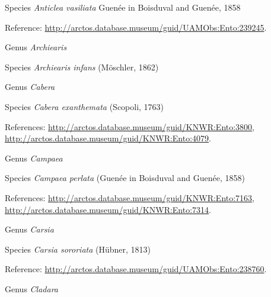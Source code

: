 \documentclass[9pt, article]{memoir}
\begin{document}
\begin{multicols}{2}
\vspace{6pt}\noindent\hspace{36pt}Species \textit{Anticlea vasiliata} Guenée in Boisduval and Guenée, 1858


\vspace{6pt}Reference: 
\url{http://arctos.database.museum/guid/UAMObs:Ento:239245}.

\vspace{6pt}\noindent\hspace{30pt}Genus \textit{Archiearis}


\vspace{6pt}\noindent\hspace{36pt}Species \textit{Archiearis infans} (Möschler, 1862)


\vspace{6pt}\noindent\hspace{30pt}Genus \textit{Cabera}


\vspace{6pt}\noindent\hspace{36pt}Species \textit{Cabera exanthemata} (Scopoli, 1763)


\vspace{6pt}References: 
\url{http://arctos.database.museum/guid/KNWR:Ento:3800}, 
\url{http://arctos.database.museum/guid/KNWR:Ento:4079}.

\vspace{6pt}\noindent\hspace{30pt}Genus \textit{Campaea}


\vspace{6pt}\noindent\hspace{36pt}Species \textit{Campaea perlata} (Guenée in Boisduval and Guenée, 1858)


\vspace{6pt}References: 
\url{http://arctos.database.museum/guid/KNWR:Ento:7163}, 
\url{http://arctos.database.museum/guid/KNWR:Ento:7314}.

\vspace{6pt}\noindent\hspace{30pt}Genus \textit{Carsia}


\vspace{6pt}\noindent\hspace{36pt}Species \textit{Carsia sororiata} (Hübner, 1813)


\vspace{6pt}Reference: 
\url{http://arctos.database.museum/guid/UAMObs:Ento:238760}.

\vspace{6pt}\noindent\hspace{30pt}Genus \textit{Cladara}



\end{multicols}
\end{document}
